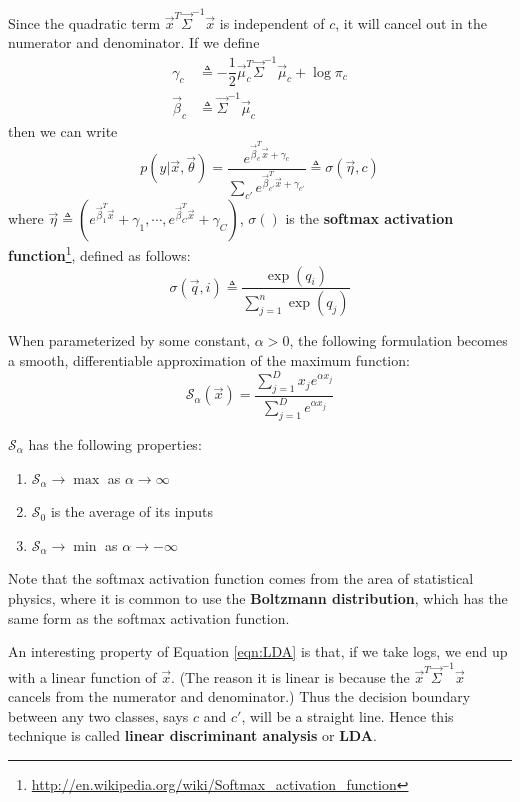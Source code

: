 Since the quadratic term $\vec{x}^T\vec{\Sigma}^{-1}\vec{x}$ is independent of $c$, it will cancel out in the numerator and denominator. If we define
\begin{align}
\gamma_c& \triangleq -\dfrac{1}{2}\vec{\mu}_c^T\vec{\Sigma}^{-1}\vec{\mu}_c+\log \pi_c \\
\vec{\beta}_c& \triangleq \vec{\Sigma}^{-1}\vec{\mu}_c
\end{align}
then we can write
\begin{equation}\label{eqn:LDA}
p(y|\vec{x},\vec{\theta})=\dfrac{e^{\vec{\beta}_c^T\vec{x}+\gamma_c}}{\sum_{c'}e^{\vec{\beta}_{c'}^T\vec{x}+\gamma_{c'}}} \triangleq \sigma(\vec{\eta}, c)
\end{equation}
where $\vec{\eta} \triangleq (e^{\vec{\beta}_1^T\vec{x}}+\gamma_1,\cdots, e^{\vec{\beta}_C^T\vec{x}}+\gamma_C)$, $\sigma()$ is the \textbf{softmax activation function}\footnote{\url{http://en.wikipedia.org/wiki/Softmax_activation_function}}, defined as follows:
\begin{equation}
\sigma(\vec{q},i) \triangleq \dfrac{\exp(q_i)}{\sum_{j=1}^n \exp(q_j)}
\end{equation}

When parameterized by some constant, $\alpha > 0$, the following formulation becomes a smooth, differentiable approximation of the maximum function:
\begin{equation}
\mathcal{S}_{\alpha}(\vec{x}) = \dfrac{\sum_{j=1}^D x_je^{\alpha x_j}}{\sum_{j=1}^D e^{\alpha x_j}}
\end{equation}

$\mathcal{S}_{\alpha}$ has the following properties:
\begin{enumerate}
\item $\mathcal{S}_{\alpha} \rightarrow \max$ as $\alpha \rightarrow \infty$
\item $\mathcal{S}_0$ is the average of its inputs
\item $\mathcal{S}_{\alpha} \rightarrow \min$ as $\alpha \rightarrow -\infty$
\end{enumerate}

Note that the softmax activation function comes from the area of statistical physics, where it is common to use the \textbf{Boltzmann distribution}, which has the same form as the softmax activation function.

An interesting property of Equation \ref{eqn:LDA} is that, if we take logs, we end up with a linear function of $\vec{x}$. (The reason it is linear is because the $\vec{x}^T\vec{\Sigma}^{-1}\vec{x}$ cancels from the numerator and denominator.) Thus the decision boundary between any two classes, says $c$ and $c'$, will be a straight line. Hence this technique is called \textbf{linear discriminant analysis} or \textbf{LDA}.

